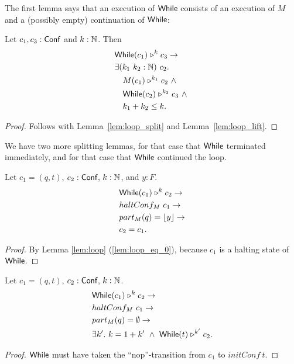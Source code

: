 The first lemma says that an execution of $\textsf{While}$ consists of an execution of $M$ and a (possibly empty) continuation of $\textsf{While}$:
\begin{lemma}
  \label{lem:While_split}
  Let $c_1, c_3 : \textsf{Conf}$ and $k:\mathbb{N}$.  Then
  \begin{alignat*}{1}
    & \textsf{While}(c_1) \mathrel{\triangleright}^k c_3 \rightarrow \\
    & \exists (k_1~k_2 : \mathbb{N})~c_2. \\
    & \quad M(c_1) \mathrel{\triangleright}^{k_1} c_2 ~\land~ \\
    & \quad \textsf{While}(c_2) \mathrel{\triangleright}^{k_2} c_3 ~\land~\\
    & \quad k_1 + k_2 \leq k.
  \end{alignat*}
\end{lemma}
\begin{proof}
  Follows with Lemma~\ref{lem:loop_split} and Lemma~\ref{lem:loop_lift}.
\end{proof}

We have two more splitting lemmas, for that case that $\textsf{While}$ terminated immediately, and for that case that $\textsf{While}$ continued the loop.
\begin{lemma}
  \label{lem:While_split_term}
  Let $c_1 = (q, t)$, $c_2 : \textsf{Conf}$, $k:\mathbb{N}$, and $y:F$.
  \begin{alignat*}{1}
    & \textsf{While}(c_1) \mathrel{\triangleright}^k c_2 \rightarrow \\
    & haltConf_M~c_1 \rightarrow \\
    & part_M(q) = \left\lfloor {y} \right\rfloor \rightarrow \\
    & c_2 = c_1.
  \end{alignat*}
\end{lemma}
\begin{proof}
  By Lemma \ref{lem:loop} (\ref{lem:loop_eq_0}), because $c_1$ is a halting state of $\textsf{While}$.
\end{proof}
\begin{lemma}
  \label{lem:While_split_repeat}
  Let $c_1 = (q, t)$, $c_2 : \textsf{Conf}$, $k:\mathbb{N}$.
  \begin{alignat*}{1}
    & \textsf{While}(c_1) \mathrel{\triangleright}^k c_2 \rightarrow \\
    & haltConf_M~c_1 \rightarrow \\
    & part_M(q) = \emptyset \rightarrow \\
    & \exists k'.~k = 1+k' ~\land~ \textsf{While}(t) \mathrel{\triangleright}^{k'} c_2.
  \end{alignat*}
\end{lemma}
\begin{proof}
  $\textsf{While}$ must have taken the ``nop''-transition from $c_1$ to $initConf~t$.
\end{proof}


